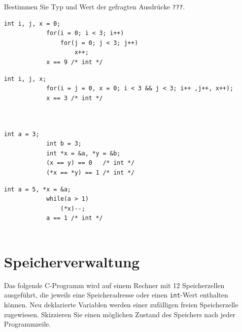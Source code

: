 \documentclass[]{article}
\begin{document}
	Bestimmen Sie Typ und Wert der gefragten Ausdrücke \lstinline|???|.
	
	\begin{minipage}[t]{0.45\linewidth}
		\begin{lstlisting}[gobble=6]
			int i, j, x = 0;
			for(i = 0; i < 3; i++)
				for(j = 0; j < 3; j++)
					x++;
			x == 9 /* int */
		\end{lstlisting}
	\end{minipage}
	\quad
	\begin{minipage}[t]{0.55\linewidth}
		\begin{lstlisting}[gobble=6]
			int i, j, x;
			for(i = j = 0, x = 0; i < 3 && j < 3; i++ ,j++, x++);
			x == 3 /* int */
			
			
		\end{lstlisting}
	\end{minipage}
	\begin{minipage}[t]{0.45\linewidth}
		\begin{lstlisting}[gobble=6]
			int a = 3;
			int b = 3;
			int *x = &a, *y = &b;
			(x == y) == 0   /* int */
			(*x == *y) == 1 /* int */
		\end{lstlisting}
	\end{minipage}
	\quad
	\begin{minipage}[t]{0.55\linewidth}
		\begin{lstlisting}[gobble=6]
			int a = 5, *x = &a;
			while(a > 1)
				(*x)--;
			a == 1 /* int */
			
		\end{lstlisting}
	\end{minipage}

	
	\section{Speicherverwaltung}
	
	Das folgende C-Programm wird auf einem Rechner mit 12 Speicherzellen ausgeführt, die jeweils eine Speicheradresse oder einen \lstinline|int|-Wert enthalten können.
	Neu deklarierte Variablen werden einer zufälligen freien Speicherzelle zugewiesen.
	Skizzieren Sie einen möglichen Zustand des Speichers nach jeder Programmzeile.\\
	
\end{document}
